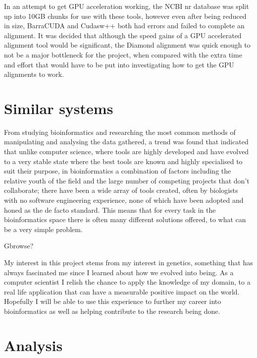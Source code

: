In an attempt to get GPU acceleration working, the NCBI nr database was split up into 10GB chunks for use with these tools, however even after being reduced in size, BarraCUDA and Cudasw++ both had errors and failed to complete an alignment. It was decided that although the speed gains of a GPU accelerated alignment tool would be significant, the Diamond alignment was quick enough to not be a major bottleneck for the project, when compared with the extra time and effort that would have to be put into investigating how to get the GPU alignments to work. 

\section{Similar systems}

From studying bioinformatics and researching the most common methods of manipulating and analysing the data gathered, a trend was found that indicated that unlike computer science, where tools are highly developed and have evolved to a very stable state where the best tools are known and highly specialised to suit their purpose, in bioinformatics a combination of factors including the relative youth of the field and the large number of competing projects that don't collaborate; there have been a wide array of tools created, often by biologists with no software engineering experience, none of which have been adopted and honed as the de facto standard. This means that for every task in the bioinformatics space there is often many different solutions offered, to what can be a very simple problem. 

Gbrowse?


My interest in this project stems from my interest in genetics, something that has always fascinated me since I learned about how we evolved into being. As a computer scientist I relish the chance to apply the knowledge of my domain, to a real life application that can have a measurable positive impact on the world. Hopefully I will be able to use this experience to further my career into bioinformatics as well as helping contribute to the research being done. 

\section{Analysis}

